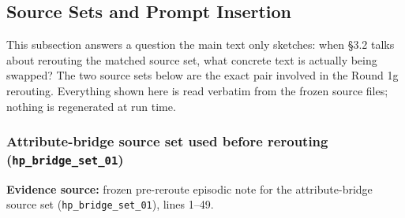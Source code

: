 \subsection{Source Sets and Prompt Insertion}

This subsection answers a question the main text only sketches: when \S3.2 talks about rerouting the matched source set, what concrete text is actually being swapped? The two source sets below are the exact pair involved in the Round 1g rerouting. Everything shown here is read verbatim from the frozen source files; nothing is regenerated at run time.

\subsubsection{Attribute-bridge source set used before rerouting (\texttt{hp\_bridge\_set\_01})}

\textbf{Evidence source:} frozen pre-reroute episodic note for the attribute-bridge source set (\texttt{hp\_bridge\_set\_01}), lines 1--49.

